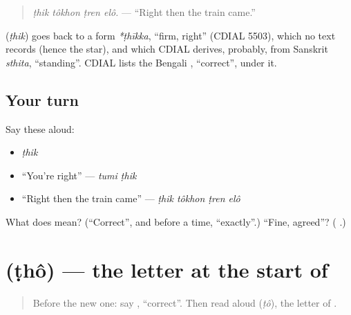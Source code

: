 \begin{quote}
\textbf{   }
\end{quote}

\begin{quote}
\emph{ṭhik tôkhon ṭren elô.} — \textquotedblleft{}Right then the train came.\textquotedblright{}
\end{quote}

\begin{cousinweb}
\textbf{} (\emph{ṭhik}) goes back to a form \emph{*ṭhīkka}, \textquotedblleft{}firm, right\textquotedblright{} (CDIAL 5503), which no text records (hence the star), and which CDIAL derives, probably, from Sanskrit \emph{sthita}, \textquotedblleft{}standing\textquotedblright{}. CDIAL lists the Bengali \textbf{}, \textquotedblleft{}correct\textquotedblright{}, under it.
\end{cousinweb}

\subsection*{Your turn}
Say these aloud:

\begin{itemize}
\raggedright
  \item \emph{ṭhik}
  \item \textquotedblleft{}You're right\textquotedblright{} — \emph{tumi ṭhik}
  \item \textquotedblleft{}Right then the train came\textquotedblright{} — \emph{ṭhik tôkhon ṭren elô}
\end{itemize}

\begin{tcolorbox}[breakable,colback=teal!4,colframe=teal!35!black,title={Before you move on}]
What does \textbf{} mean? (\textquotedblleft{}Correct\textquotedblright{}, and before a time, \textquotedblleft{}exactly\textquotedblright{}.) \textquotedblleft{}Fine, agreed\textquotedblright{}? (\textbf{ }.)
\end{tcolorbox}
\section[\texorpdfstring{\bn{ঠ} (ṭhô)}{ঠ (ṭhô)}]{ (ṭhô) — the letter at the start of }

\label{lesson:BN-W266-letter-ttha}



\begin{quote}
Before the new one: say \textbf{}, \textquotedblleft{}correct\textquotedblright{}. Then read \textbf{} aloud (\emph{ṭô}), the letter of \textbf{}.
\end{quote}

